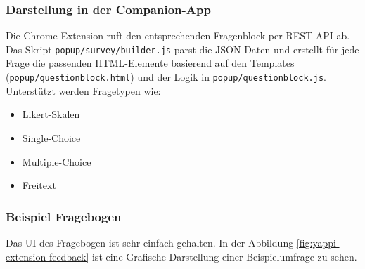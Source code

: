 \documentclass[12pt,a4paper]{report}
\begin{document}
    \subsubsection{Darstellung in der Companion-App}
        Die Chrome Extension ruft den entsprechenden Fragenblock per REST-API ab.
        Das Skript \texttt{popup/survey/builder.js} parst die JSON-Daten und erstellt für jede Frage die passenden HTML-Elemente
        basierend auf den Templates (\texttt{popup/questionblock.html}) und der Logik in \texttt{popup/questionblock.js}.
        Unterstützt werden Fragetypen wie:
        \begin{itemize}
            \item Likert-Skalen
            \item Single-Choice
            \item Multiple-Choice
            \item Freitext
        \end{itemize}

    \subsubsection{Beispiel Fragebogen}
        Das UI des Fragebogen ist sehr einfach gehalten. In der Abbildung \ref{fig:yappi-extension-feedback} ist eine Grafische-Darstellung
        einer Beispielumfrage zu sehen.
\end{document}
